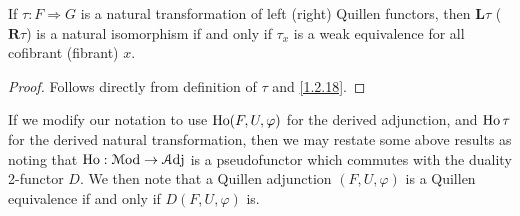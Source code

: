 \begin{lemma}\label{3.3.12}
	If $\tau : F \Rightarrow G$ is a natural transformation of left (right) Quillen functors, then $\mathbf{L} \tau$ ($\mathbf{R}  \tau$) is a natural isomorphism if and only if $\tau_x$ is a weak equivalence for all cofibrant (fibrant) $x$.
\end{lemma}
\begin{proof}
	Follows directly from definition of $\tau$ and \cref{1.2.18}.
\end{proof}

\begin{remark}\label{3.3.13}
	If we modify our notation to use $\operatorname{Ho} (F,U,\varphi)$ for the derived adjunction, and $\operatorname{Ho} \tau$ for the derived natural transformation, then we may restate some above results as noting that $\operatorname{Ho} : \mathcal{M} \mathrm{od}  \to \mathcal{A} \mathrm{dj} $ is a pseudofunctor which commutes with the duality 2-functor $D$. We then note that a Quillen adjunction $(F,U,\varphi)$ is a Quillen equivalence if and only if $D(F,U,\varphi)$ is.
\end{remark}

